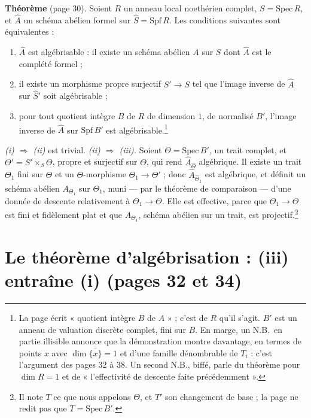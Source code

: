 \documentclass[11pt,a4paper]{article}
\begin{document}
\textbf{Théorème} (page 30). Soient $R$ un anneau local noethérien complet,
$S = \mathrm{Spec}\,R$, et $\hat A$ un schéma abélien formel sur
$\hat S = \mathrm{Spf}\,R$. Les conditions suivantes sont équivalentes :
\begin{enumerate}
  \item[(i)] $\hat A$ est algébrisable : il existe un schéma abélien $A$ sur
  $S$ dont $\hat A$ est le complété formel ;
  \item[(ii)] il existe un morphisme propre surjectif $S' \to S$ tel que
  l'image inverse de $\hat A$ sur $\hat S'$ soit algébrisable ;
  \item[(iii)] pour tout quotient intègre $B$ de $R$ de dimension $1$, de
  normalisé $B'$, l'image inverse de $\hat A$ sur $\mathrm{Spf}\,B'$ est
  algébrisable.\footnote{La page écrit « quotient intègre $B$ de $A$ » ;
  c'est de $R$ qu'il s'agit. $B'$ est un anneau de valuation discrète
  complet, fini sur $B$. En marge, un N.B.\ en partie illisible annonce que
  la démonstration montre davantage, en termes de points $x$ avec
  $\dim \overline{\{x\}} = 1$ et d'une famille dénombrable de $T_i$ : c'est
  l'argument des pages 32 à 38. Un second N.B., biffé, parle du théorème
  pour $\dim R = 1$ et de « l'effectivité de descente faite
  précédemment ».}
\end{enumerate}

\emph{(i) $\Rightarrow$ (ii)} est trivial. \emph{(ii) $\Rightarrow$ (iii).}
Soient $\Theta = \mathrm{Spec}\,B'$, un trait complet, et
$\Theta' = S' \times_S \Theta$, propre et surjectif sur $\Theta$, qui rend
$\hat A_{\hat\Theta}$ algébrique. Il existe un trait $\Theta_1$ fini sur
$\Theta$ et un $\Theta$-morphisme $\Theta_1 \to \Theta'$ ; donc
$\hat A_{\hat\Theta_1}$ est algébrique, et définit un schéma abélien
$A_{\Theta_1}$ sur $\Theta_1$, muni --- par le théorème de comparaison --- d'une
donnée de descente relativement à $\Theta_1 \to \Theta$. Elle est effective,
parce que $\Theta_1 \to \Theta$ est fini et fidèlement plat et que
$A_{\Theta_1}$, schéma abélien sur un trait, est
projectif.\footnote{Il note $T$ ce que nous appelons $\Theta$, et $T'$ son
changement de base ; la page ne redit pas que $T = \mathrm{Spec}\,B'$.}

\section*{Le théorème d'algébrisation : (iii) entraîne (i) (pages 32 et 34)}
\end{document}
